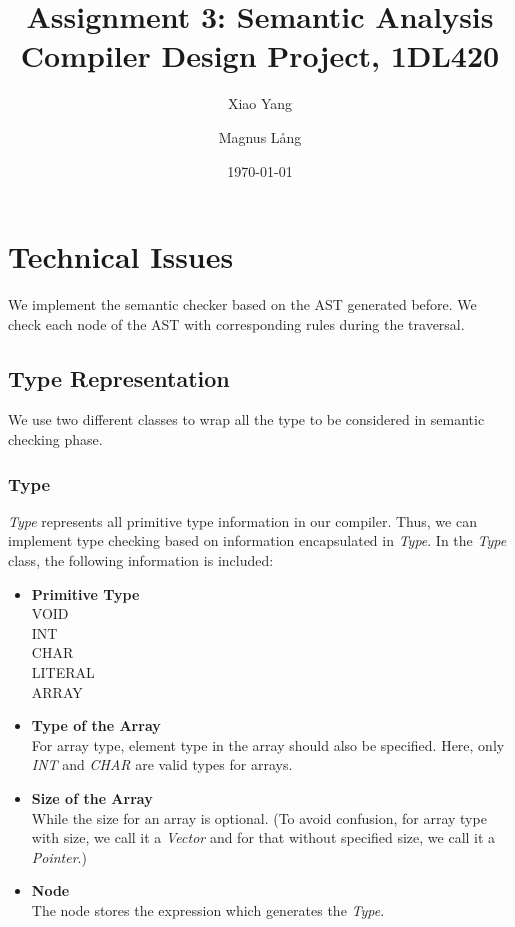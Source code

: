 \documentclass[a4paper,11pt]{article}
\title{Assignment 3: Semantic Analysis \\
       Compiler Design Project, 1DL420}
\author{Xiao Yang \and Magnus L{\aa}ng} %
\date{\today}
\begin{document}
\maketitle

\section{Technical Issues}
We implement the semantic checker based on the AST generated before.
We check each node of the AST with corresponding rules during the traversal.

\subsection{Type Representation}
We use two different classes to wrap all the type to be considered in semantic checking phase. 
\subsubsection{Type}
\emph{Type} represents all primitive type information in our compiler. 
Thus, we can implement type checking based on information encapsulated in \emph{Type}.
In the \emph{Type} class, the following information is included:
\begin{itemize}
	
	\item \textbf{ Primitive Type} \\
	VOID \\
	INT \\
	CHAR	 \\
	LITERAL \\
	ARRAY 
	
	\item \textbf{Type of the Array} \\
	For array type, element type in the array should also be specified. 
	Here, only \emph{INT} and \emph{CHAR} are valid types for arrays. 
	
	\item \textbf{Size of the Array} \\
	While the size for an array is optional. (To avoid confusion, for array type with size, we call it a
	\emph{Vector} and for that without specified size, we call it a \emph{Pointer}.)
	
	\item \textbf{Node} \\
	The node stores the expression which generates the \emph{Type}.
	
\end{itemize}
\end{document}
